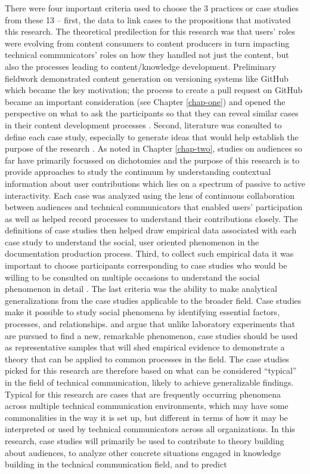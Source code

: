 There were four important criteria used to choose the 3 practices or case studies from these 13 – first, the data to link cases to the propositions \cite{Campbell_2000} that motivated this research. The theoretical predilection for this research was that users' roles were evolving from content consumers to content producers in turn impacting technical communicators' roles on how they handled not just the content, but also the processes leading to content/knowledge development. Preliminary fieldwork demonstrated content generation on versioning systems like GitHub which became the key motivation; the process to create a pull request on GitHub became an important consideration (see Chapter \ref{chap-one}) and opened the perspective on what to ask the participants so that they can reveal similar cases in their content development processes \cite{Campbell_2000}. Second, literature was consulted to define each case study, especially to generate ideas that would help establish the purpose of the research \cite{Campbell_2000, Rashid_Rashid_Warraich_Sabir_Waseem_2019, Yin_1994}. As noted in Chapter \ref{chap-two}, studies on audiences so far have primarily focussed on dichotomies and the purpose of this research is to provide approaches to study the continuum by understanding contextual information about user contributions which lies on a spectrum of passive to active interactivity. Each case was analyzed using the lens of continuous collaboration between audiences and technical communicators that enabled users’ participation as well as helped record processes to understand their contributions closely. The definitions of case studies then helped draw empirical data associated with each case study to understand the social, user oriented phenomenon in the documentation production process. Third, to collect such empirical data it was important to choose participants corresponding to case studies who would be willing to be consulted on multiple occasions to understand the social phenomenon in detail \cite{Rashid_Rashid_Warraich_Sabir_Waseem_2019}. The last criteria was the ability to make analytical generalizations from the case studies applicable to the broader field. Case studies make it possible to study social phenomena by identifying essential factors, processes, and relationships. \textcite{Yin_2017} and \textcite{Campbell_2000} argue that unlike laboratory experiments that are pursued to find a new, remarkable phenomenon, case studies should be used as representative samples that will shed empirical evidence to demonstrate a theory that can be applied to common processes in the field. The case studies picked for this research are therefore based on what can be considered “typical” in the field of technical communication, likely to achieve generalizable findings. Typical for this research are cases that are frequently occurring phenomena across multiple technical communication environments, which may have some commonalities in the way it is set up, but different in terms of how it may be interpreted or used by technical communicators across all organizations. In this research, case studies will primarily be used to contribute to  theory building about audiences, to analyze other concrete situations engaged in knowledge building in the technical communication field, and to predict 
